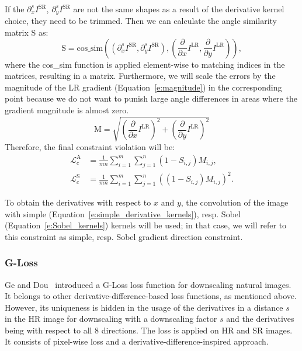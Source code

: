 If the $\partial_x^s I^\text{SR}$, $\partial_y^s I^\text{SR}$ are not the same shapes as a result of the derivative kernel choice, they need to be trimmed.
Then we can calculate the angle similarity matrix S as:
\begin{equation}
    \text{S} = 
    \text{cos\_sim}\left(\left(\partial^s_x I^\text{SR}, \partial^s_y I^\text{SR} \right), \left(\frac{\partial}{\partial x} I^\text{LR}, \frac{\partial}{\partial y} I^\text{LR}\right)\right),
\end{equation}
where the cos\_sim function is applied element-wise to matching indices in the matrices, resulting in a matrix.
Furthermore, we will scale the errors by the magnitude of the LR gradient (Equation~\eqref{e:magnitude}) in the corresponding point because we do not want to punish large angle differences in areas where the gradient magnitude is almost zero.
\begin{equation}
    \text{M} = \sqrt{\left(\frac{\partial}{\partial x} I^\text{LR}\right)^2 + \left(\frac{\partial}{\partial y} I^\text{LR}\right)^2}
\label{e:magnitude}
\end{equation}
Therefore, the final constraint violation will be:
\begin{equation}
    \begin{aligned}
        \mathcal{L}_c^\text{A} &= \frac{1}{mn}\sum_{i = 1}^m\sum_{j = 1}^n(1-S_{i,j})M_{i,j}, \\
        \mathcal{L}_c^\text{S} &= \frac{1}{mn}\sum_{i = 1}^m\sum_{j = 1}^n\left((1-S_{i,j})M_{i,j}\right)^2.
    \end{aligned}
\end{equation}

To obtain the derivatives with respect to $x$ and $y$, the convolution of the image with simple (Equation~\eqref{e:simple_derivative_kernels}), resp. Sobel (Equation~\eqref{e:Sobel_kernels}) kernels will be used; in that case, we will refer to this constraint as simple, resp. Sobel gradient direction constraint.

\subsubsection{G-Loss}

Ge and Dou~\cite{Ge2023} introduced a G-Loss loss function for downscaling natural images.
It belongs to other derivative-difference-based loss functions, as mentioned above.
However, its uniqueness is hidden in the usage of the derivatives in a distance $s$ in the HR image for downscaling with a downscaling factor $s$ and the derivatives being with respect to all 8 directions.
The loss is applied on HR and SR images. 
It consists of pixel-wise loss and a derivative-difference-inspired approach. 

